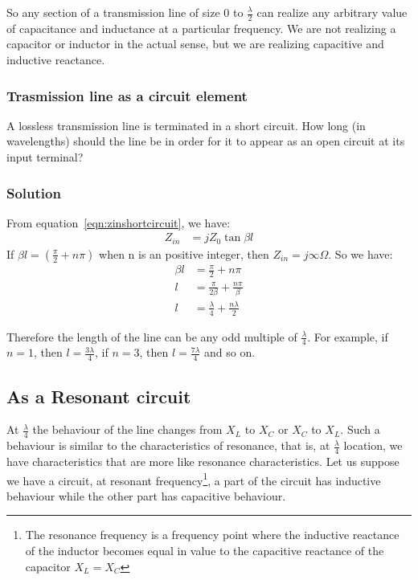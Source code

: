 So any section of a transmission line of size 0 to $ \frac{\lambda}{2} $ can realize any arbitrary value of capacitance and inductance at a particular frequency. We are not realizing a capacitor or inductor in the actual sense, but we are realizing capacitive and inductive reactance.

\begin{exmp}
	\subsubsection*{Trasmission line as a circuit element}
	A lossless transmission line is terminated in a short circuit. How long (in wavelengths) should the line be in order for it to appear as an open circuit at its input terminal?
	
	\subsubsection*{Solution}
	From equation~\eqref{eqn:zinshortcircuit}, we have:
	\begin{align*}
		Z_{in} &= jZ_{0}\tan\beta l
	\end{align*}
	If $\beta l = (\frac{\pi}{2} + n\pi)$ when n is an positive integer, then $Z_{in} = j\infty\varOmega$. So we have:
	\begin{align*}
		\beta l &= \frac{\pi}{2} + n\pi\\
		l &= \frac{\pi}{2\beta} + \frac{n\pi}{\beta}\\
		l &= \frac{\lambda}{4} + \frac{n\lambda}{2}
	\end{align*}
	
	Therefore the length of the line can be any odd multiple of $\frac{\lambda}{4}$. For example, if $n = 1$, then $l = \frac{3\lambda}{4}$, if $n = 3$, then $l = \frac{7\lambda}{4}$ and so on.
\end{exmp}

\subsection{As a Resonant circuit}
At $ \frac{\lambda}{4} $ the behaviour of the line changes from $ X_{L} $ to $ X_{C} $ or $ X_{C} $ to $ X_{L} $. Such a behaviour is similar to the characteristics of resonance, that is, at $\frac{\lambda}{4}$ location, we have characteristics that are more like resonance characteristics. Let us suppose we have a circuit, at resonant frequency\footnote{
	The resonance frequency is a frequency point where the inductive reactance of the inductor becomes equal in value to the capacitive reactance of the capacitor $ X_{L} = X_{C} $
}, a part of the circuit has inductive behaviour while the other part has capacitive behaviour. 

